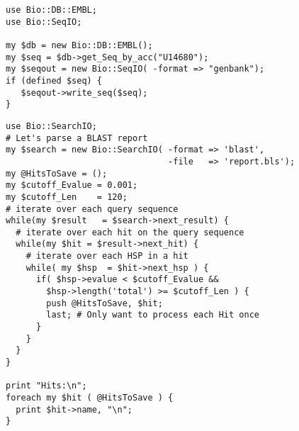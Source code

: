\documentclass[12pt]{article}
\begin{document}
\newpage

\singlespacing

%
%

\newpage

\begin{verbatim}
use Bio::DB::EMBL;
use Bio::SeqIO;

my $db = new Bio::DB::EMBL();
my $seq = $db->get_Seq_by_acc("U14680");
my $seqout = new Bio::SeqIO( -format => "genbank");
if (defined $seq) { 
   $seqout->write_seq($seq);
}
\end{verbatim}

\newpage

\begin{verbatim}
use Bio::SearchIO;
# Let's parse a BLAST report 
my $search = new Bio::SearchIO( -format => 'blast',
                                -file   => 'report.bls');
my @HitsToSave = ();
my $cutoff_Evalue = 0.001; 
my $cutoff_Len    = 120;   
# iterate over each query sequence
while(my $result   = $search->next_result) {
  # iterate over each hit on the query sequence
  while(my $hit = $result->next_hit) {
    # iterate over each HSP in a hit
    while( my $hsp  = $hit->next_hsp ) {
      if( $hsp->evalue < $cutoff_Evalue && 
        $hsp->length('total') >= $cutoff_Len ) { 
        push @HitsToSave, $hit;
        last; # Only want to process each Hit once
      } 
    }
  }
}

print "Hits:\n";
foreach my $hit ( @HitsToSave ) {
  print $hit->name, "\n";	
}

\end{verbatim}
\end{document}
